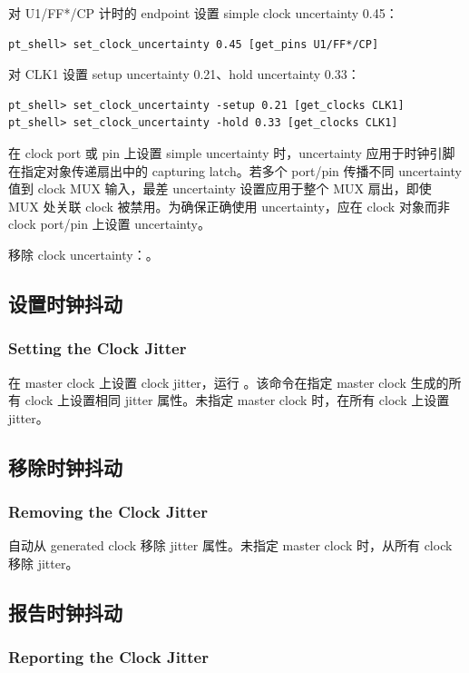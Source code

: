 对 U1/FF*/CP 计时的 endpoint 设置 simple clock uncertainty 0.45：
\begin{lstlisting}
pt_shell> set_clock_uncertainty 0.45 [get_pins U1/FF*/CP]
\end{lstlisting}

对 CLK1 设置 setup uncertainty 0.21、hold uncertainty 0.33：
\begin{lstlisting}
pt_shell> set_clock_uncertainty -setup 0.21 [get_clocks CLK1]
pt_shell> set_clock_uncertainty -hold 0.33 [get_clocks CLK1]
\end{lstlisting}

在 clock port 或 pin 上设置 simple uncertainty 时，uncertainty 应用于时钟引脚在指定对象传递扇出中的 capturing latch。若多个 port/pin 传播不同 uncertainty 值到 clock MUX 输入，最差 uncertainty 设置应用于整个 MUX 扇出，即使 MUX 处关联 clock 被禁用。为确保正确使用 uncertainty，应在 clock 对象而非 clock port/pin 上设置 uncertainty。

移除 clock uncertainty：。

\subsection{设置时钟抖动}
\subsubsection*{Setting the Clock Jitter}

在 master clock 上设置 clock jitter，运行 。该命令在指定 master clock 生成的所有 clock 上设置相同 jitter 属性。未指定 master clock 时，在所有 clock 上设置 jitter。

\subsection{移除时钟抖动}
\subsubsection*{Removing the Clock Jitter}

 自动从 generated clock 移除 jitter 属性。未指定 master clock 时，从所有 clock 移除 jitter。

\subsection{报告时钟抖动}
\subsubsection*{Reporting the Clock Jitter}

